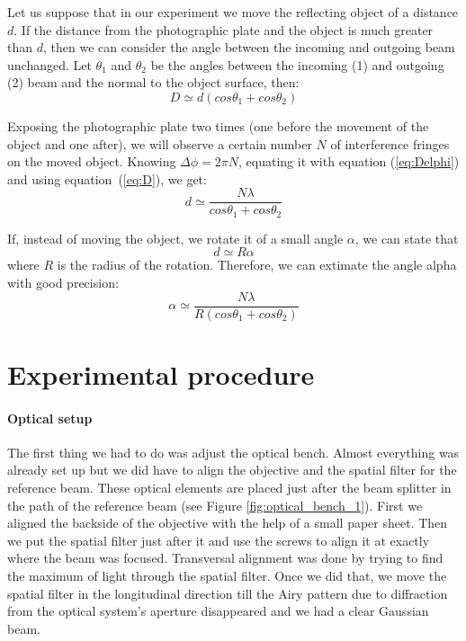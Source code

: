 \documentclass[11pt,a4paper]{article}
\begin{document}
Let us suppose that in our experiment we move the reflecting object of a distance $d$. If the distance from the photographic plate and the object is much greater than $d$, then we can consider the angle between the incoming and outgoing beam unchanged. Let $\theta_1$ and $\theta_2$ be the angles between the incoming (1) and outgoing (2) beam and the normal to the object surface, then: 
\begin{equation}
D\simeq d(cos\theta_1+cos\theta_2)\label{eq:D}
\end{equation}

Exposing the photographic plate two times (one before the movement of the object and one after), we will observe a certain number $N$ of interference fringes on the moved object. Knowing $\Delta \phi=2\pi N$, equating it with equation (\ref{eq:Delphi}) and using equation~(\ref{eq:D}), we get:
\begin{equation}
d\simeq\frac{N\lambda}{cos\theta_1+cos\theta_2}\label{eq:d}
\end{equation}

If, instead of moving the object, we rotate it of a small angle $\alpha$, we can state that
\begin{equation}
d\simeq R\alpha
\end{equation}
where $R$ is the radius of the rotation. Therefore, we can extimate the angle alpha with good precision:
\begin{equation}
\alpha\simeq \frac{N\lambda}{R(cos\theta_1+cos\theta_2)}\label{eq:alp}
\end{equation}
\section{Experimental procedure}
\paragraph{Optical setup}
The first thing we had to do was adjust the optical bench. Almost everything was already set up but we did have to align the objective and the spatial filter for the reference beam. These optical elements are placed just after the beam splitter in the path of the reference beam (see Figure \ref{fig:optical_bench_1}). First we aligned the backside of the objective with the help of a small paper sheet. Then we put the spatial filter just after it and use the screws to align it at exactly where the beam was focused. Transversal alignment was done by trying to find the maximum of light through the spatial filter. Once we did that, we move the spatial filter in the longitudinal direction till the Airy pattern due to diffraction from the optical system's aperture disappeared and we had a clear Gaussian beam.
\end{document}
